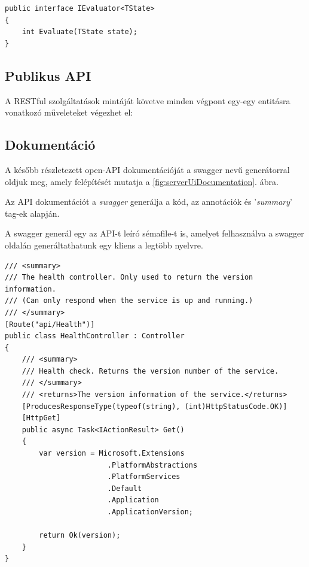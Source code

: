 \documentclass[twoside, a4paper, 12pt]{book}
\begin{document}
\begin{lstlisting}[caption=A kiértékelő interface, label=lst:algorithm_evaluator_code]
public interface IEvaluator<TState>
{
	int Evaluate(TState state);
}
\end{lstlisting}





\subsection{Publikus API}
A RESTful szolgáltatások mintáját követve minden végpont egy-egy entitásra vonatkozó műveleteket végezhet el:














\subsection{Dokumentáció}
A később részletezett open-API dokumentációját a swagger nevű generátorral oldjuk meg, amely felépítését mutatja a \ref{fig:serverUiDocumentation}. ábra.

Az API dokumentációt a \textit{swagger}\cite{swaggerHomepage} generálja a kód, az annotációk és '\textit{summary}' tag-ek alapján.

A swagger generál egy az API-t leíró sémafile-t is, amelyet felhasználva a swagger oldalán generáltathatunk egy kliens a legtöbb nyelvre.

\begin{lstlisting}[caption=Health-check példakód 'summary' tag-ekkel., label=lst:healtcheck]
/// <summary>
/// The health controller. Only used to return the version information.
/// (Can only respond when the service is up and running.)
/// </summary>
[Route("api/Health")]
public class HealthController : Controller
{
	/// <summary>
	/// Health check. Returns the version number of the service.
	/// </summary>
	/// <returns>The version information of the service.</returns>
	[ProducesResponseType(typeof(string), (int)HttpStatusCode.OK)]
	[HttpGet]
	public async Task<IActionResult> Get()
	{
		var version = Microsoft.Extensions
						.PlatformAbstractions
						.PlatformServices
						.Default
						.Application
						.ApplicationVersion;

		return Ok(version);
	}
}
\end{lstlisting}
\end{document}
